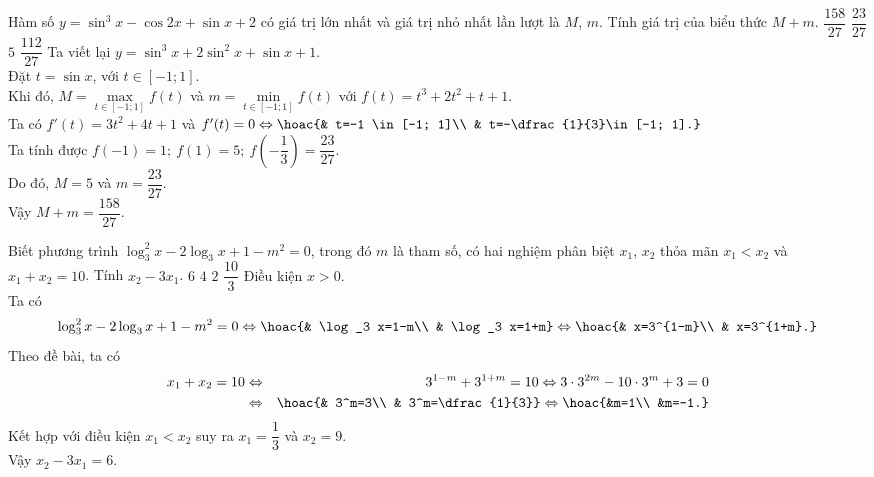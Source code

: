 \begin{ex}%
	Hàm số $y=\sin^3 x-\cos 2x+\sin x+2$ có giá trị lớn nhất và giá trị nhỏ nhất lần lượt là $M$, $m$. Tính giá trị của biểu thức $M+m$.
	\choice
	{\True $\dfrac{158}{27}$}
	{$\dfrac{23}{27}$}
	{$5$}
	{$\dfrac{112}{27}$}
	\loigiai
	{
		Ta viết lại $y=\sin^3 x+2\sin^2 x+\sin x+1$.\\
		Đặt $t=\sin x$, với $t\in [-1;1]$.\\
		Khi đó, $ M=\max\limits_{t\in [-1; 1]}f(t) $ và $ m=\min\limits_{t\in [-1; 1]}f(t) $ với $ f(t)=t^3+2t^2+t+1 $.\\
		Ta có $f'(t)=3t^2+4t+1$ và $ f'(t)=0\Leftrightarrow\hoac{& t=-1 \in [-1; 1]\\ & t=-\dfrac{1}{3}\in [-1; 1].} $\\
		Ta tính được $ f(-1)=1;\ f(1)=5;\ f\left(-\dfrac{1}{3}\right)=\dfrac{23}{27} $.\\
		Do đó, $ M=5 $ và $ m=\dfrac{23}{27} $.\\
		Vậy $ M+m= \dfrac{158}{27}$.
	}
\end{ex}

\begin{ex}%
	Biết phương trình $\log_3^2 x-2\log_3 x+1-m^2=0$, trong đó $m$ là tham số, có hai nghiệm phân biệt $x_1$, $x_2$ thỏa mãn $x_1<x_2$ và $x_1+x_2=10$. Tính $x_2-3x_1$.	
	\choice
	{\True $6$}
	{$4$}
	{$2$}
	{$\dfrac{10}{3}$}
	\loigiai
	{
		Điều kiện $ x>0 $.\\
		Ta có $$\log_3^2 x-2\log_3 x+1-m^2=0\Leftrightarrow\hoac{& \log_3 x=1-m\\ & \log_3 x=1+m}\Leftrightarrow \hoac{& x=3^{1-m}\\ & x=3^{1+m}.}$$
		Theo đề bài, ta có
		\begin{eqnarray*}
			x_1+x_2=10 &\Leftrightarrow & 3^{1-m}+3^{1+m}=10\Leftrightarrow 3\cdot 3^{2m}-10\cdot 3^m+3=0\\
			&\Leftrightarrow & \hoac{& 3^m=3\\ & 3^m=\dfrac{1}{3}}\Leftrightarrow\hoac{&m=1\\ &m=-1.}
		\end{eqnarray*}
		Kết hợp với điều kiện $x_1<x_2$ suy ra $x_1=\dfrac{1}{3}$ và $x_2=9$.\\
		Vậy $x_2-3x_1=6$.	
	}
\end{ex}

